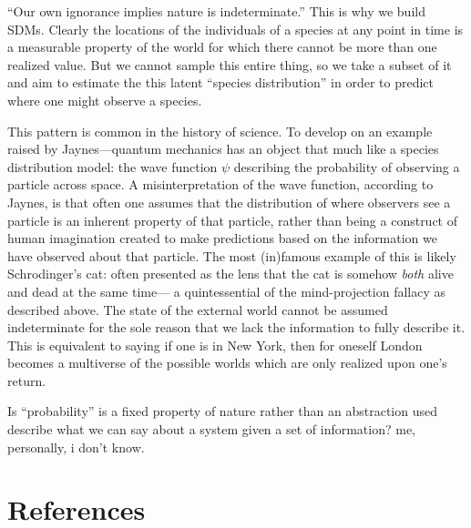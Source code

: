 \documentclass[10pt,oneside]{article}
\begin{document}
``Our own ignorance implies nature is indeterminate.'' This is why we
build SDMs. Clearly the locations of the individuals of a species at any
point in time is a measurable property of the world for which there
cannot be more than one realized value. But we cannot sample this entire
thing, so we take a subset of it and aim to estimate the this latent
``species distribution'' in order to predict where one might observe a
species.

This pattern is common in the history of science. To develop on an
example raised by Jaynes---quantum mechanics has an object that much
like a species distribution model: the wave function \(\psi\) describing
the probability of observing a particle across space. A
misinterpretation of the wave function, according to Jaynes, is that
often one assumes that the distribution of where observers see a
particle is an inherent property of that particle, rather than being a
construct of human imagination created to make predictions based on the
information we have observed about that particle. The most (in)famous
example of this is likely Schrodinger's cat: often presented as the lens
that the cat is somehow \emph{both} alive and dead at the same time--- a
quintessential of the mind-projection fallacy as described above. The
state of the external world cannot be assumed indeterminate for the sole
reason that we lack the information to fully describe it. This is
equivalent to saying if one is in New York, then for oneself London
becomes a multiverse of the possible worlds which are only realized upon
one's return.

Is ``probability'' is a fixed property of nature rather than an
abstraction used describe what we can say about a system given a set of
information? me, personally, i don't know.

\hypertarget{references}{%
\section{References}\label{references}}
\end{document}
